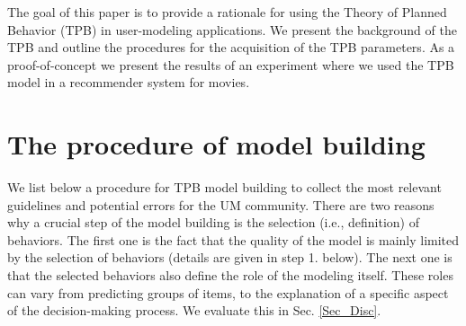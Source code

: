 \documentclass{llncs}
\begin{document}
The goal of this paper is to provide a rationale for using the Theory of Planned Behavior (TPB) in user-modeling applications. We present the background of the TPB and outline the procedures for the acquisition of the TPB parameters. As a proof-of-concept we present the results of an experiment where we used the TPB model in a recommender system for movies.




\section{The procedure of model building}\label{Sec_AzenProc}

We list below a procedure for TPB model building to collect the most relevant guidelines and potential errors for the UM community. There are two reasons why a crucial step of the model building is the selection (i.e., definition) of behaviors. The first one is the fact that the quality of the model is mainly limited by the selection of behaviors (details are given in step 1. below). The next one is that the selected behaviors also define the role of the modeling itself. These roles can vary from predicting groups of items, to the explanation of a specific aspect of the decision-making process. We evaluate this in Sec. \ref{Sec_Disc}.
\end{document}
